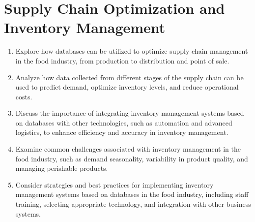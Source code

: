 \documentclass{article}
\begin{document}
\section{Supply Chain Optimization and Inventory Management}
\begin{enumerate}
    \item Explore how databases can be utilized to optimize supply chain management in the food industry, from production to distribution and point of sale.
    
    \item Analyze how data collected from different stages of the supply chain can be used to predict demand, optimize inventory levels, and reduce operational costs.
    
    \item Discuss the importance of integrating inventory management systems based on databases with other technologies, such as automation and advanced logistics, to enhance efficiency and accuracy in inventory management.
    
    \item Examine common challenges associated with inventory management in the food industry, such as demand seasonality, variability in product quality, and managing perishable products.
    
    \item Consider strategies and best practices for implementing inventory management systems based on databases in the food industry, including staff training, selecting appropriate technology, and integration with other business systems.

\end{enumerate}
\end{document}
